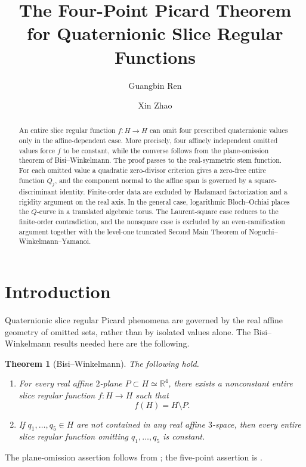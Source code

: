 \documentclass[11pt]{amsart}
\title[Four-Point Picard Theorem]{The Four-Point Picard Theorem for Quaternionic Slice Regular Functions}
\author[G. Ren]{Guangbin Ren}
\author[X. Zhao]{Xin Zhao}
\date{}
\def\HH{H}%
\numberwithin{equation}{section}
\newtheorem{theorem}{Theorem}[section]
\theoremstyle{definition}
\theoremstyle{remark}
\newcommand{\HH}{\mathbb H}
\newcommand{\RR}{\mathbb R}
\begin{document}
\begin{abstract}
An entire slice regular function $f:\HH\to\HH$ can omit four prescribed quaternionic values only in the affine-dependent case.  More precisely, four affinely independent omitted values force $f$ to be constant, while the converse follows from the plane-omission theorem of Bisi--Winkelmann.  The proof passes to the real-symmetric stem function.  For each omitted value a quadratic zero-divisor criterion gives a zero-free entire function $Q_j$, and the component normal to the affine span is governed by a square-discriminant identity.  Finite-order data are excluded by Hadamard factorization and a rigidity argument on the real axis.  In the general case, logarithmic Bloch--Ochiai places the $Q$-curve in a translated algebraic torus.  The Laurent-square case reduces to the finite-order contradiction, and the nonsquare case is excluded by an even-ramification argument together with the level-one truncated Second Main Theorem of Noguchi--Winkelmann--Yamanoi.
\end{abstract}

\maketitle



\section{Introduction}
\label{sec:introduction}

Quaternionic slice regular Picard phenomena are governed by the real affine geometry of omitted sets, rather than by isolated values alone.  The Bisi--Winkelmann results needed here are the following.

\begin{theorem}[Bisi--Winkelmann]\label{thm:bw-inputs}
The following hold.
\begin{enumerate}[label=\textup{(\roman*)}]
\item For every real affine $2$-plane $P\subset\HH\simeq\RR^4$, there exists a nonconstant entire slice regular function $f:\HH\to\HH$ such that
\[
f(\HH)=\HH\setminus P.
\]
\item If $q_1,\ldots,q_5\in\HH$ are not contained in any real affine $3$-space, then every entire slice regular function omitting $q_1,\ldots,q_5$ is constant.
\end{enumerate}
\end{theorem}
The plane-omission assertion follows from \cite[Proposition~5.1, Proposition~6.1 and the subsequent remark]{BisiWinkelmann2020QuaternionicPicard}; the five-point assertion is \cite[Theorem~3.5]{BisiWinkelmann2020QuaternionicPicard}.
\end{document}
